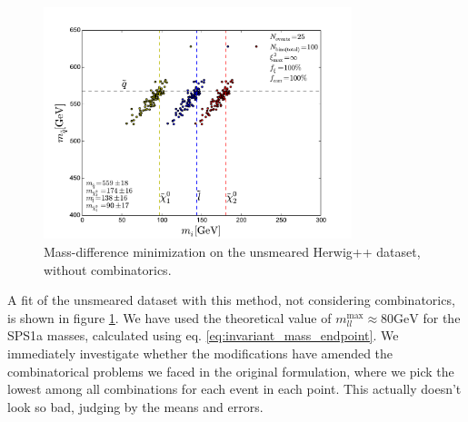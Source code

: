\documentclass[twoside,english]{uiofysmaster}
\begin{document}
\begin{figure}[hbt]
	\centering
	\includegraphics[width=0.8\textwidth]{figures/improving_combinatorics/herwigpp-MD-dileptonedge-fit-nocomb-nosmear-nocut.pdf} 
	\caption{Mass-difference minimization on the unsmeared Herwig++ dataset, without combinatorics.}
	\label{fig:MD_nocomb}
\end{figure}

A fit of the unsmeared dataset with this method, not considering combinatorics, is shown in figure \ref{fig:MD_nocomb}. We have used the theoretical value of $m_{ll}^\mathrm{max} \approx 80 \mathrm{GeV}$ for the SPS1a masses, calculated using eq. \eqref{eq:invariant_mass_endpoint}. We immediately investigate whether the modifications have amended the combinatorical problems we faced in the original formulation, where we pick the lowest among all combinations for each event in each point. This actually doesn't look so bad, judging by the means and errors.
\end{document}
